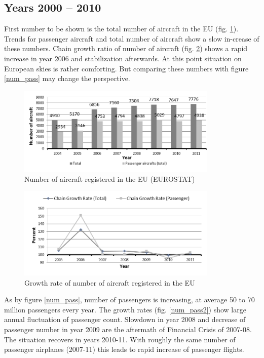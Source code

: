 \subsection{Years 2000 -- 2010}

First number to be shown is the total number of aircraft in the EU (fig. \ref{num_aircraft}). Trends for passenger aircraft and total number of aircraft show a slow in-crease of these numbers. Chain growth ratio of number of aircraft (fig. \ref{num_aircraft2}) shows a rapid increase in year 2006 and stabilization afterwards. At this point situation on European skies is rather comforting. But comparing these numbers with figure \ref{num_pass} may change the perspective.

\begin{figure}[h!]
\centering %
\includegraphics[width=0.85\textwidth]{Pictures/num_aircraft.png}
\caption{Number of aircraft registered in the EU (EUROSTAT)}
\label{num_aircraft}
\end{figure}

\begin{figure}[h!]
\centering %
\includegraphics[width=0.85\textwidth]{Pictures/num_aircraft2.png}
\caption{Growth rate of number of aircraft registered in the EU}
\label{num_aircraft2}
\end{figure}

As by figure \ref{num_pass}, number of passengers is increasing, at average 50 to 70 million passengers every year. The growth rates (fig. \ref{num_pass2}) show large annual fluctuation of passenger count. Slowdown in year 2008 and decrease of passenger number in year 2009 are the aftermath of Financial Crisis of 2007-08. The situation recovers in years 2010-11. With roughly the same number of passenger airplanes (2007-11) this leads to rapid increase of passenger flights.

